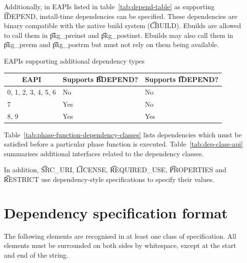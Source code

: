  Additionally, in EAPIs listed in table~\ref{tab:depend-table} as supporting
\t{IDEPEND}, install-time dependencies can be specified. These dependencies are binary compatible
with the native build system (\t{CBUILD}). Ebuilds are allowed to call them in \t{pkg_preinst} and
\t{pkg_postinst}. Ebuilds may also call them in \t{pkg_prerm} and \t{pkg_postrm} but must not rely
on them being available.

\begin{centertable}{EAPIs supporting additional dependency types}
    \label{tab:depend-table}
    \begin{tabular}{lll}
      \toprule
      \multicolumn{1}{c}{\textbf{EAPI}} &
      \multicolumn{1}{c}{\textbf{Supports \t{BDEPEND}?}} &
      \multicolumn{1}{c}{\textbf{Supports \t{IDEPEND}?}} \\
      \midrule
      0, 1, 2, 3, 4, 5, 6 & No  & No  \\
      7                   & Yes & No  \\
      8, 9                & Yes & Yes \\
      \bottomrule
    \end{tabular}
\end{centertable}

Table~\ref{tab:phase-function-dependency-classes} lists dependencies which must be satisfied before
a particular phase function is executed. Table~\ref{tab:dep-class-api} summarises additional
interfaces related to the dependency classes.

In addition, \t{SRC_URI}, \t{LICENSE}, \t{REQUIRED_USE}, \t{PROPERTIES} and \t{RESTRICT} use
dependency-style specifications to specify their values.

\section{Dependency specification format}
\label{sec:dependency-spec}

The following elements are recognised in at least one class of specification. All elements must
be surrounded on both sides by whitespace, except at the start and end of the string.

